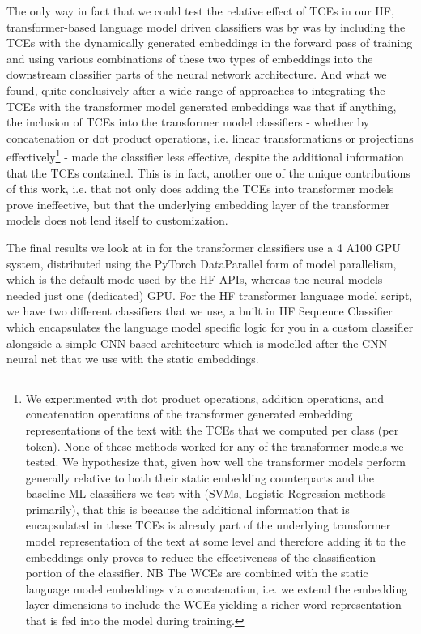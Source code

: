\documentclass[final]{clv2025}
\begin{document}
The only way in fact that we could test the relative effect of TCEs in our HF, transformer-based language model driven classifiers was by was by including the TCEs with the dynamically generated embeddings in the forward pass of training and using various combinations of these two types of embeddings into the downstream classifier parts of the neural network architecture. And what we found, quite conclusively after a wide range of approaches to integrating the TCEs with the transformer model generated embeddings was that if anything, the inclusion of TCEs into the transformer model classifiers - whether by concatenation or dot product operations, i.e. linear transformations or projections effectively\footnote{We experimented with dot product operations, addition operations, and concatenation operations of the transformer generated embedding representations of the text with the TCEs that we computed per class (per token). None of these methods worked for any of the transformer models we tested. We hypothesize that, given how well the transformer models perform generally relative to both their static embedding counterparts and the baseline ML classifiers we test with (SVMs, Logistic Regression methods primarily), that this is because the additional information that is encapsulated in these TCEs is already part of the underlying transformer model representation of the text at some level and therefore adding it to the embeddings only proves to reduce the effectiveness of the classification portion of the classifier. NB The WCEs are combined with the static language model embeddings via concatenation, i.e. we extend the embedding layer dimensions to include the WCEs yielding a richer word representation that is fed into the model during training.} - made the classifier less effective, despite the additional information that the TCEs contained. This is in fact, another one of the unique contributions of this work, i.e. that not only does adding the TCEs into transformer models prove ineffective, but that the underlying embedding layer of the transformer models does not lend itself to customization.

The final results we look at in for the transformer classifiers use a 4 A100 GPU system, distributed using the PyTorch DataParallel form of model parallelism, which is the default mode used by the HF APIs, whereas the neural models needed just one (dedicated) GPU. For the HF transformer language model script, we have two different classifiers that we use, a built in HF Sequence Classifier which encapsulates the language model specific logic for you in a custom classifier alongside a simple CNN based architecture which is modelled after the CNN neural net that we use with the static embeddings.
\end{document}
